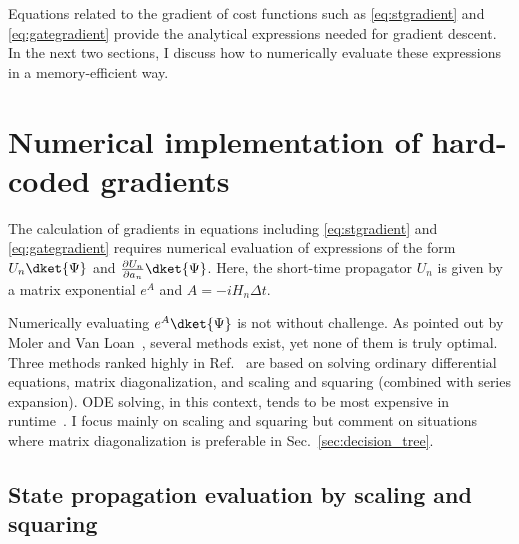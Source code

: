 Equations related to the gradient of cost functions such as \eqref{eq:stgradient} and \eqref{eq:gategradient} provide the analytical expressions needed for gradient descent. In the next two sections, I discuss how to numerically evaluate these expressions in a memory-efficient way. 


\section{Numerical implementation of hard-coded gradients}
\label{sec:implementation}

The calculation of gradients in equations including \eqref{eq:stgradient} and \eqref{eq:gategradient} requires numerical evaluation of expressions of the form $U_n\dket{\Psi}$  and $\frac{\partial U_n}{\partial a_n} \dket{\Psi}$. 
Here, the short-time propagator $U_n$ is given by a matrix exponential $e^A$ and $A=-iH_n\Delta t$. 

Numerically evaluating  $e^A\dket{\Psi}$ is not without challenge. As pointed out by Moler and Van Loan~\cite{expmoler2003nineteen}, several methods exist, yet none of them is truly optimal. Three methods ranked highly in Ref.~\cite{expmoler2003nineteen} are based on solving ordinary differential equations, matrix diagonalization, and scaling and squaring (combined with series expansion). ODE solving, in this context, tends to be most expensive in runtime~\cite{semiadgoerz2022quantum}. I focus mainly on scaling and squaring but comment on situations where matrix diagonalization is preferable in Sec.~\ref{sec:decision_tree}. 

\subsection{State propagation evaluation by scaling and squaring}
\label{sec:scaling_squaring}

